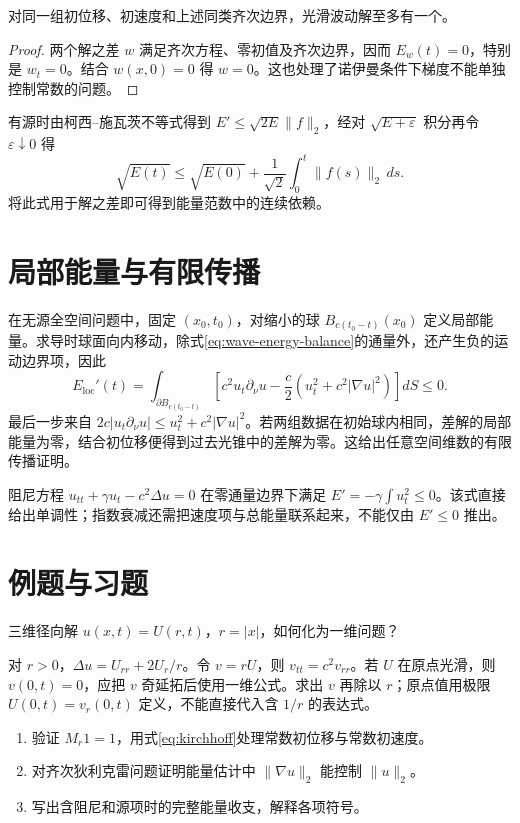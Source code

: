 \documentclass[UTF8,12pt,a4paper,fontset=fandol]{ctexbook}
\begin{document}
\begin{proposition}
对同一组初位移、初速度和上述同类齐次边界，光滑波动解至多有一个。
\end{proposition}
\begin{proof}
两个解之差 $w$ 满足齐次方程、零初值及齐次边界，因而 $E_w(t)=0$，特别是 $w_t=0$。结合 $w(x,0)=0$ 得 $w=0$。这也处理了诺伊曼条件下梯度不能单独控制常数的问题。
\end{proof}
有源时由柯西--施瓦茨不等式得到 $E'\le\sqrt{2E}\|f\|_2$，经对 $\sqrt{E+\varepsilon}$ 积分再令 $\varepsilon\downarrow0$ 得
\[
 \sqrt{E(t)}\le\sqrt{E(0)}+\frac1{\sqrt2}\int_0^t\|f(s)\|_2\,ds.
\]
将此式用于解之差即可得到能量范数中的连续依赖。

\section{局部能量与有限传播}
在无源全空间问题中，固定 $(x_0,t_0)$，对缩小的球 $B_{c(t_0-t)}(x_0)$ 定义局部能量。求导时球面向内移动，除式\eqref{eq:wave-energy-balance}的通量外，还产生负的运动边界项，因此
\[
 E_{\mathrm{loc}}'(t)=\int_{\partial B_{c(t_0-t)}}
 \left[c^2u_t\partial_\nu u-\frac c2(u_t^2+c^2|\nabla u|^2)\right]dS\le0.
\]
最后一步来自 $2c|u_t\partial_\nu u|\le u_t^2+c^2|\nabla u|^2$。若两组数据在初始球内相同，差解的局部能量为零，结合初位移便得到过去光锥中的差解为零。这给出任意空间维数的有限传播证明。

阻尼方程 $u_{tt}+\gamma u_t-c^2\Delta u=0$ 在零通量边界下满足 $E'=-\gamma\int u_t^2\le0$。该式直接给出单调性；指数衰减还需把速度项与总能量联系起来，不能仅由 $E'\le0$ 推出。

\section{例题与习题}
\begin{example}
三维径向解 $u(x,t)=U(r,t)$，$r=|x|$，如何化为一维问题？
\end{example}
\begin{solve}
对 $r>0$，$\Delta u=U_{rr}+2U_r/r$。令 $v=rU$，则 $v_{tt}=c^2v_{rr}$。若 $U$ 在原点光滑，则 $v(0,t)=0$，应把 $v$ 奇延拓后使用一维公式。求出 $v$ 再除以 $r$；原点值用极限 $U(0,t)=v_r(0,t)$ 定义，不能直接代入含 $1/r$ 的表达式。
\end{solve}
\begin{enumerate}
 \item 验证 $M_r1=1$，用式\eqref{eq:kirchhoff}处理常数初位移与常数初速度。
 \item 对齐次狄利克雷问题证明能量估计中 $\|\nabla u\|_2$ 能控制 $\|u\|_2$。
 \item 写出含阻尼和源项时的完整能量收支，解释各项符号。
\end{enumerate}
\end{document}
